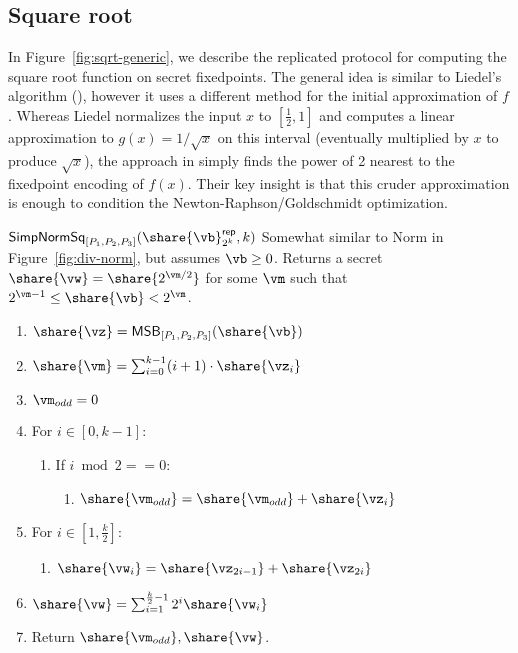 \subsection{Square root}
\label{subsec:sqrt}

In Figure~\ref{fig:sqrt-generic}, we describe the replicated protocol for computing
the square root function on secret fixedpoints. The general idea is similar to
Liedel's algorithm (\cite{Liedel2012SecureDC}), however it uses a different method
for the initial approximation of $f$. Whereas Liedel normalizes the input $x$ to
$[\frac{1}{2}, 1]$ and computes a linear approximation to $g(x) = 1 / \sqrt{x}$ on
this interval (eventually multiplied by $x$ to produce $\sqrt{x}$), the approach in
\cite{ACNS:AlySma19} simply finds the power of 2 nearest to the fixedpoint
encoding of $f(x)$. Their key insight is that this cruder approximation is enough
to condition the Newton-Raphson/Goldschmidt optimization.

\msubsubsection
  {$\mathsf{SimpNormSq}_{[P_1, P_2, P_3]}(\share{\vb}^\mathsf{rep}_{2^k}, k)$}
  \label{fig:simp-norm-sq}
  Somewhat similar to Norm in Figure~\ref{fig:div-norm}, but assumes $\vb \geq 0$.
  Returns a secret $\share{\vw} = \share{2^{\vm/2}}$ for some $\vm$ such that
  $2^{\vm-1} \leq \share{\vb} < 2^\vm$.
  \begin{enumerate}
    \item $\share{\vz} = \mathsf{MSB}_{[P_1, P_2, P_3]} ( \share{\vb})$
    \item $\share{\vm} = \sum_{i=0}^{k-1}(i+1)\cdot\share{\vz_i}$
    \item $\vm_{odd} = 0$
    \item For $i \in [0, k-1]$:
    \begin{enumerate}
      \item If $i \bmod 2 == 0$:
      \begin{enumerate}
        \item $\share{\vm_{odd}} = \share{\vm_{odd}} + \share{\vz_i}$
      \end{enumerate}
    \end{enumerate}
    \item For $i \in [1, \frac{k}{2}]$:
    \begin{enumerate}
      \item $\share{\vw_i} = \share{\vz_{2i-1}} + \share{\vz_{2i}}$
    \end{enumerate}
    \item $\share{\vw} = \sum_{i=1}^{\frac{k}{2} - 1}2^i\share{\vw_i}$
    \item Return $\share{\vm_{odd}},\share{\vw}$.
  \end{enumerate}


